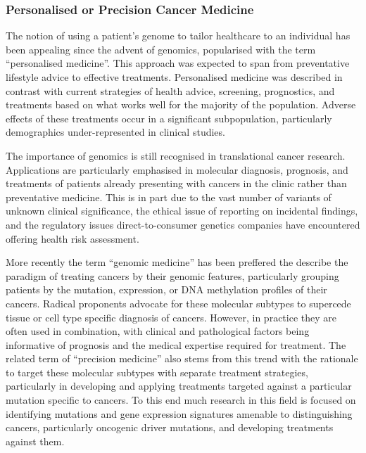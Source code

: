 \subsubsection{Personalised or Precision Cancer Medicine}
The notion of using a patient's genome to tailor healthcare to an individual has been appealing since the advent of \gls{genomics}, popularised with the term ``personalised medicine''. This approach was expected to span from preventative lifestyle advice to effective treatments. Personalised medicine was described in contrast with current strategies of health advice, screening, prognostics, and treatments based on what works well for the majority of the population. Adverse effects of these treatments occur in a significant subpopulation, particularly demographics under-represented in clinical studies.

The importance of \gls{genomics} is still recognised in translational cancer research. Applications are particularly emphasised in molecular diagnosis, prognosis, and treatments of patients already presenting with cancers in the clinic rather than preventative medicine. This is in part due to the vast number of variants of unknown clinical significance, the ethical issue of reporting on incidental findings, and the regulatory issues direct-to-consumer genetics companies have encountered offering health risk assessment.

More recently the term ``genomic medicine'' has been preffered the describe the paradigm of treating cancers by their genomic features, particularly grouping patients by the mutation, expression, or DNA methylation profiles of their cancers. Radical proponents advocate for these molecular subtypes to supercede tissue or cell type specific diagnosis of cancers. However, in practice they are often used in combination, with clinical and pathological factors being informative of prognosis and the medical expertise required for treatment. The related term of ``precision medicine'' also stems from this trend with the rationale to target these molecular subtypes with separate treatment strategies, particularly in developing and applying treatments targeted against a particular mutation specific to cancers. To this end much research in this field is focused on identifying mutations and gene expression signatures amenable to distinguishing cancers, particularly oncogenic driver mutations, and developing treatments against them.

